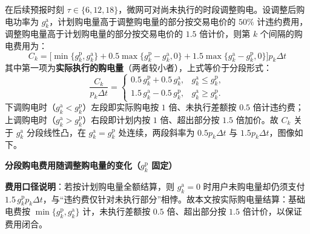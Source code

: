 在后续预报时刻 $\tau\in\{6,12,18\}$，微网可对尚未执行的时段调整购电。设调整后购电功率为 $g^{\mathrm{a}}_k$，计划购电量高于调整购电量的部分按交易电价的 $50\%$ 计违约费用，调整购电量高于计划购电量的部分按交易电价的 $1.5$ 倍计价，则第 $k$ 个间隔的购电费用为：
\begin{equation}
    C_k=\Big[\min\{g^{\mathrm{p}}_k,g^{\mathrm{a}}_k\}+0.5\max\{g^{\mathrm{p}}_k-g^{\mathrm{a}}_k,0\}+1.5\max\{g^{\mathrm{a}}_k-g^{\mathrm{p}}_k,0\}\Big]p_k\Delta t
    \label{eq:q3_Ck}
\end{equation}
其中第一项为\textbf{实际执行的购电量}（两者较小者），上式等价于分段形式：
\[
\frac{C_k}{p_k\Delta t}=
\begin{cases}
0.5\,g^{\mathrm{p}}_k+0.5\,g^{\mathrm{a}}_k, & g^{\mathrm{a}}_k\leq g^{\mathrm{p}}_k,\\[6pt]
1.5\,g^{\mathrm{a}}_k-0.5\,g^{\mathrm{p}}_k, & g^{\mathrm{a}}_k\geq g^{\mathrm{p}}_k.
\end{cases}
\]
下调购电时（$g^{\mathrm{a}}_k<g^{\mathrm{p}}_k$）左段即实际购电按 $1$ 倍、未执行差额按 $0.5$ 倍计违约费；上调购电时（$g^{\mathrm{a}}_k>g^{\mathrm{p}}_k$）右段即计划内按 $1$ 倍、超出部分按 $1.5$ 倍加价。故 $C_k$ 关于 $g^{\mathrm{a}}_k$ 分段线性凸，在 $g^{\mathrm{a}}_k=g^{\mathrm{p}}_k$ 处连续，两段斜率为 $0.5p_k\Delta t$ 与 $1.5p_k\Delta t$，图像如下。
\begin{center}

{\bfseries 分段购电费用随调整购电量的变化（$g^{\mathrm{p}}_k$ 固定）}
\end{center}

\textbf{费用口径说明}：若按计划购电量全额结算，则 $g^{\mathrm{a}}_k=0$ 时用户未购电量却仍须支付 $1.5\,g^{\mathrm{p}}_k p_k\Delta t$，与“违约费仅针对未执行部分”相悖。故本文按实际购电量结算：基础电费按 $\min\{g^{\mathrm{p}}_k,g^{\mathrm{a}}_k\}$ 计，未执行差额按 $0.5$ 倍、超出部分按 $1.5$ 倍计价，以保证费用闭合。

